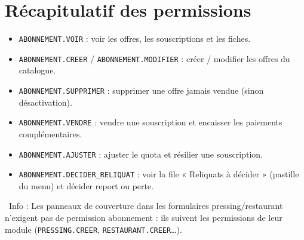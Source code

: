 \documentclass[12pt,a4paper]{article}
\newcommand{\info}[1]{\par\noindent\textcolor{lagoon}{\faInfoCircle\ Info : #1}\par}
\begin{document}
\newpage

\section{Récapitulatif des permissions}

\begin{itemize}[label=\textcolor{lagoon}{\faKey}]
  \item \texttt{ABONNEMENT.VOIR} : voir les offres, les souscriptions et les fiches.
  \item \texttt{ABONNEMENT.CREER} / \texttt{ABONNEMENT.MODIFIER} : créer / modifier les offres du catalogue.
  \item \texttt{ABONNEMENT.SUPPRIMER} : supprimer une offre jamais vendue (sinon désactivation).
  \item \texttt{ABONNEMENT.VENDRE} : vendre une souscription et encaisser les paiements complémentaires.
  \item \texttt{ABONNEMENT.AJUSTER} : ajuster le quota et résilier une souscription.
  \item \texttt{ABONNEMENT.DECIDER\_RELIQUAT} : voir la file « Reliquats à décider » (pastille du menu) et décider report ou perte.
\end{itemize}

\info{Les panneaux de couverture dans les formulaires pressing/restaurant n'exigent pas de permission abonnement : ils suivent les permissions de leur module (\texttt{PRESSING.CREER}, \texttt{RESTAURANT.CREER}…).}
\end{document}
